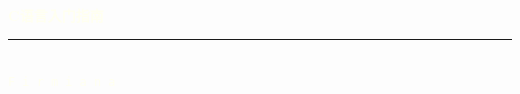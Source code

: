 \documentclass[12pt, a4paper]{article}
\begin{document}
    \phantom{a}\\[2em]
    \begin{flushright}
        {\heiti \fontsize{37pt}{\baselineskip}\selectfont \textbf{\textcolor{Ivory}{C语言入门指南}}} \\[2em]
        \textcolor{Ivory}{\rule{27em}{0.5pt}} \\[3em]
        {\fontsize{24pt}{\baselineskip}\selectfont \textcolor{Ivory}{\texttt{F\,i\,r\,m\,i\,a\,n\,a}}}
    \end{flushright}
\end{document}
